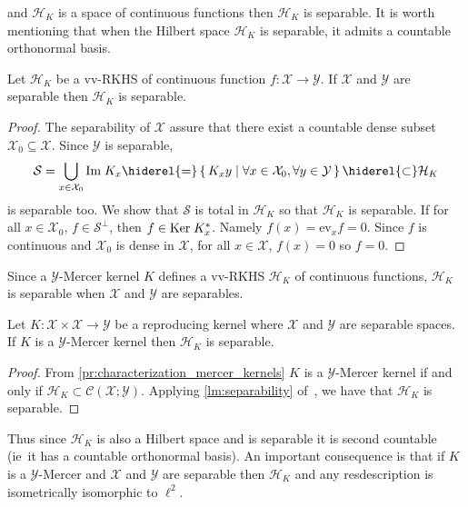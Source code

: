 and $\mathcal{H}_K$ is a space of continuous functions then $\mathcal{H}_K$ is
separable. It is worth mentioning that when the Hilbert space $\mathcal{H}_K$
is separable, it admits a countable orthonormal basis.
\begin{lemma}
    \label{lm:separability} Let $\mathcal{H}_K$ be a \acl{vv-RKHS} of
    continuous function $f:\mathcal{X}\to\mathcal{Y}$. If $\mathcal{X}$ and
    $\mathcal{Y}$ are separable then $\mathcal{H}_K$ is separable.
\end{lemma}
\begin{proof}
    The separability of $\mathcal{X}$ assure that there exist a countable dense
    subset $\mathcal{X}_0\subseteq\mathcal{X}$. Since $\mathcal{Y}$ is
    separable,
    \begin{dmath*}
        \mathcal{S}=\bigcup_{x\in\mathcal{X}_0}\Ima K_x
        \hiderel{=}\set{K_xy|\forall x\in\mathcal{X}_0, \forall
        y\in\mathcal{Y}}\hiderel{\subset} \mathcal{H}_K
    \end{dmath*}
    is separable too. We show that $\mathcal{S}$ is total in $\mathcal{H}_K$ so
    that $\mathcal{H}_K$ is separable. If for all $x\in\mathcal{X}_0$,
    $f\in\mathcal{S}^{\perp}$, then $f\in\text{Ker}\; K_x^*$. Namely
    $f(x)=\text{ev}_xf=0$. Since $f$ is continuous and $\mathcal{X}_0$ is dense
    in $\mathcal{X}$, for all $x\in\mathcal{X}$, $f(x)=0$ so $f=0$.
\end{proof}
Since a $\mathcal{Y}$-Mercer kernel $K$ defines a \ac{vv-RKHS} $\mathcal{H}_K$
of continuous functions, $\mathcal{H}_K$ is separable when $\mathcal{X}$ and
$\mathcal{Y}$ are separables.
\begin{proposition}
    \label{pr:mercer_countable_basis} Let
    $K:\mathcal{X}\times\mathcal{X}\to\mathcal{Y}$ be a reproducing kernel
    where $\mathcal{X}$ and $\mathcal{Y}$ are separable spaces. If $K$ is a
    $\mathcal{Y}$-Mercer kernel then $\mathcal{H}_K$ is separable.
\end{proposition}
\begin{proof}
    From \cref{pr:characterization_mercer_kernels} $K$ is a
    $\mathcal{Y}$-Mercer kernel if and only if $\mathcal{H}_K\subset
    \mathcal{C}(\mathcal{X};\mathcal{Y})$. Applying \cref{lm:separability}
    of~\citet{carmeli2006vector}, we have that $\mathcal{H}_K$ is separable.
\end{proof}
Thus since $\mathcal{H}_K$ is also a Hilbert space and is separable it is
second countable (\acs{ie}~it has a countable orthonormal basis). An important
consequence is that if $K$ is a $\mathcal{Y}$-Mercer and $\mathcal{X}$ and
$\mathcal{Y}$ are separable then $\mathcal{H}_K$ and any resdescription is
isometrically isomorphic to $\ell^2$.

